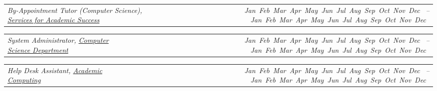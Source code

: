 \documentclass[9pt,letterpaper]{extarticle}
\makeatletter
\newcommand{\headerrow}[2]
{\begin{tabular*}{\linewidth}{l@{\extracolsep{\fill}}r}
	#1 &
	#2 \\
\end{tabular*}}
\newcommand{\DatestampYM}[2]{\mbox{\ShortMonth{#2} #1}}
\newcommand{\ShortMonth}[1]{
\ifcase#1\relax
\or Jan
\or Feb
\or Mar
\or Apr
\or May
\or Jun
\or Jul
\or Aug
\or Sep
\or Oct
\or Nov
\or Dec
\fi}
\makeatother
\begin{document}
\begin{itemize}
	\headerrow
		{\emph{By-Appointment Tutor (Computer Science), \href{https://www.rocky.edu/academics/academic-support/services-academic-success}{Services for Academic Success}}}
		{\emph{\DatestampYM{2012}{09} -- \DatestampYM{2014}{05}}}
	\headerrow
		{\emph{System Administrator, \href{http://cs.rocky.edu}{Computer Science Department}}}
		{\emph{\DatestampYM{2012}{03} -- \DatestampYM{2014}{05}}}
	\headerrow
		{\emph{Help Desk Assistant, \href{https://www.rocky.edu/resources/offices-departments/academic-computing}{Academic Computing}}}
		{\emph{\DatestampYM{2011}{09} -- \DatestampYM{2013}{05}}}

\end{itemize}
\end{document}

